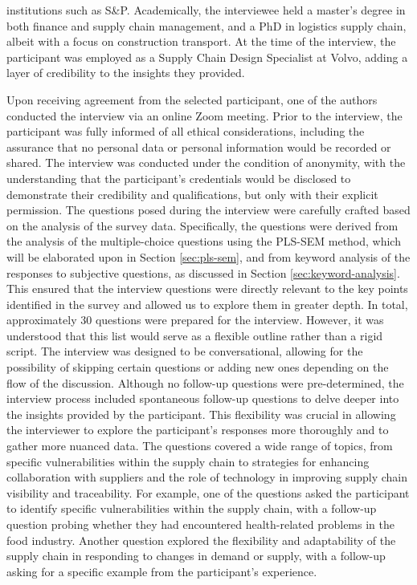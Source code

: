 institutions such as S\&P. Academically, the interviewee held a master's degree in both finance and supply chain management, and a PhD in logistics supply chain, albeit with a focus on construction transport. At the time of the interview, the participant was employed as a Supply Chain Design Specialist at Volvo, adding a layer of credibility to the insights they provided.


Upon receiving agreement from the selected participant, one of the authors conducted the interview via an online Zoom meeting. Prior to the interview, the participant was fully informed of all ethical considerations, including the assurance that no personal data or personal information would be recorded or shared. The interview was conducted under the condition of anonymity, with the understanding that the participant's credentials would be disclosed to demonstrate their credibility and qualifications, but only with their explicit permission. The questions posed during the interview were carefully crafted based on the analysis of the survey data. Specifically, the questions were derived from the analysis of the multiple-choice questions using the PLS-SEM method, which will be elaborated upon in Section \ref{sec:pls-sem}, and from keyword analysis of the responses to subjective questions, as discussed in Section \ref{sec:keyword-analysis}. This ensured that the interview questions were directly relevant to the key points identified in the survey and allowed us to explore them in greater depth. In total, approximately 30 questions were prepared for the interview. However, it was understood that this list would serve as a flexible outline rather than a rigid script. The interview was designed to be conversational, allowing for the possibility of skipping certain questions or adding new ones depending on the flow of the discussion. Although no follow-up questions were pre-determined, the interview process included spontaneous follow-up questions to delve deeper into the insights provided by the participant. This flexibility was crucial in allowing the interviewer to explore the participant's responses more thoroughly and to gather more nuanced data. The questions covered a wide range of topics, from specific vulnerabilities within the supply chain to strategies for enhancing collaboration with suppliers and the role of technology in improving supply chain visibility and traceability. For example, one of the questions asked the participant to identify specific vulnerabilities within the supply chain, with a follow-up question probing whether they had encountered health-related problems in the food industry. Another question explored the flexibility and adaptability of the supply chain in responding to changes in demand or supply, with a follow-up asking for a specific example from the participant's experience.

